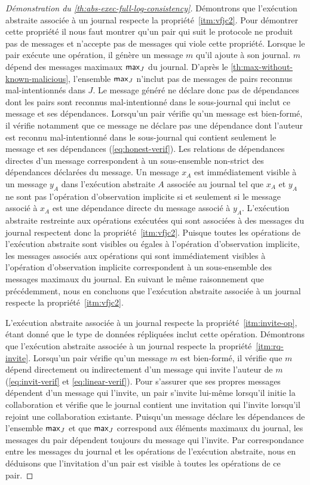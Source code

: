 \begin{proof}[Démonstration du \autoref{th:abs-exec-full-log-consistency}]
Démontrons que l'exécution abstraite associée à un journal respecte la propriété~\ref{itm:vfjc2}.
Pour démontrer cette propriété il nous faut montrer qu'un pair qui suit le protocole ne produit pas de messages et n'accepte pas de messages qui viole cette propriété.
Lorsque le pair exécute une opération, il génère un message $m$ qu'il ajoute à son journal.
$m$ dépend des messages maximaux $\operatorname{\mathsf{max}}_J$ du journal.
D'après le \autoref{th:max-without-known-malicious}, l'ensemble $\operatorname{\mathsf{max}}_J$ n'inclut pas de messages de pairs reconnus mal-intentionnés dans $J$.
Le message généré ne déclare donc pas de dépendances dont les pairs sont reconnus mal-intentionné dans le sous-journal qui inclut ce message et ses dépendances.
Lorsqu'un pair vérifie qu'un message est bien-formé, il vérifie notamment que ce message ne déclare pas une dépendance dont l'auteur est reconnu mal-intentionné dans le sous-journal qui contient seulement le message et ses dépendances (\autoref{eq:honest-verif}).
Les relations de dépendances directes d'un message correspondent à un sous-ensemble non-strict des dépendances déclarées du message.
Un message $x_A$ est immédiatement visible à un message $y_A$ dans l'exécution abstraite $A$ associée au journal tel que $x_A$ et $y_A$ ne sont pas l'opération d'observation implicite si et seulement si le message associé à $x_A$ est une dépendance directe du message associé à $y_A$.
L'exécution abstraite restreinte aux opérations exécutées qui sont associées à des messages du journal respectent donc la propriété~\ref{itm:vfjc2}.
Puisque toutes les opérations de l'exécution abstraite sont visibles ou égales à l'opération d'observation implicite, les messages associés aux opérations qui sont immédiatement visibles à l'opération d'observation implicite correspondent à un sous-ensemble des messages maximaux du journal.
En suivant le même raisonnement que précédemment, nous en concluons que l'exécution abstraite associée à un journal respecte la propriété~\ref{itm:vfjc2}.

\medskip

L'exécution abstraite associée à un journal respecte la propriété~\ref{itm:invite-op}, étant donné que le type de données répliquées inclut cette opération.
Démontrons que l'exécution abstraite associée à un journal respecte la propriété~\ref{itm:rq-invite}.
Lorsqu'un pair vérifie qu'un message $m$ est bien-formé, il vérifie que $m$ dépend directement ou indirectement d'un message qui invite l'auteur de $m$ (\autoref{eq:invit-verif} et \autoref{eq:linear-verif}).
Pour s'assurer que ses propres messages dépendent d'un message qui l'invite, un pair s'invite lui-même lorsqu'il initie la collaboration et vérifie que le journal contient une invitation qui l'invite lorsqu'il rejoint une collaboration existante.
Puisqu'un message déclare les dépendances de l'ensemble $\operatorname{\mathsf{max}}_J$ et que $\operatorname{\mathsf{max}}_J$ correspond aux éléments maximaux du journal, les messages du pair dépendent toujours du message qui l'invite.
Par correspondance entre les messages du journal et les opérations de l'exécution abstraite, nous en déduisons que l'invitation d'un pair est visible à toutes les opérations de ce pair.


\end{proof}
